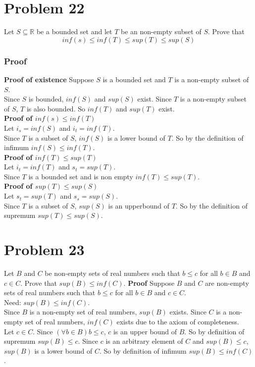 \documentclass{article}
\begin{document}
\section*{Problem 22}
Let $S \subseteq \mathbb{R}$ be a bounded set and let $T$ be an non-empty subset of $S$. Prove that $$inf(s) \leq inf(T) \leq sup(T) \leq sup(S)$$
\subsubsection*{Proof}
\textbf{Proof of existence}
Suppose $S$ is a bounded set and $T$ is a non-empty subset of $S$.\\
Since $S$ is bounded, $inf(S)$ and $sup(S)$ exist. Since $T$ is a non-empty subset of $S$, $T$ is also bounded. So $inf(T)$ and $sup(T)$ exist.\\
\textbf{Proof of $inf(s) \leq inf(T)$}\\
Let $i_s = inf(S)$ and $i_t = inf(T)$.\\
Since $T$ is a subset of $S$, $inf(S)$ is a lower bound of $T$. So by the definition of infimum $inf(S) \leq inf(T)$.\\
\textbf{Proof of $inf(T) \leq sup(T)$}\\
Let $i_t = inf(T)$ and $s_t = sup(T)$.\\
Since $T$ is a bounded set and is non empty $inf(T) \leq sup(T)$.\\
\textbf{Proof of $sup(T) \leq sup(S)$}\\
Let $s_t = sup(T)$ and $s_s = sup(S)$.\\
Since $T$ is a subset of $S$, $sup(S)$ is an upperbound of $T$. So by the definition of supremum $sup(T) \leq sup(S)$.\\ 

\section*{Problem 23}
Let $B$ and $C$ be non-empty sets of real numbers such that $b \leq c$  for all $b \in B$ and $c \in C$. Prove that $sup(B) \leq inf(C)$.
\textbf{Proof}
Suppose $B$ and $C$ are non-empty sets of real numbers such that $b \leq c$ for all $b \in B$ and $c \in C$.\\
Need: $sup(B) \leq inf(C)$.\\
Since $B$ is a non-empty set of real numbers, $sup(B)$ exists. Since $C$ is a non-empty set of real numbers, $inf(C)$ exists due to the axiom of completeness.\\
Let $c \in C$. Since $(\forall b \in B) b \leq c$, $c$ is an upper bound of $B$. So by definition of supremum $sup(B) \leq c$. Since $c$ is an arbitrary element of $C$ and $sup(B) \leq c$, $sup(B)$ is a lower bound of $C$. So by definition of infimum $sup(B) \leq inf(C)$.\\
\end{document}
